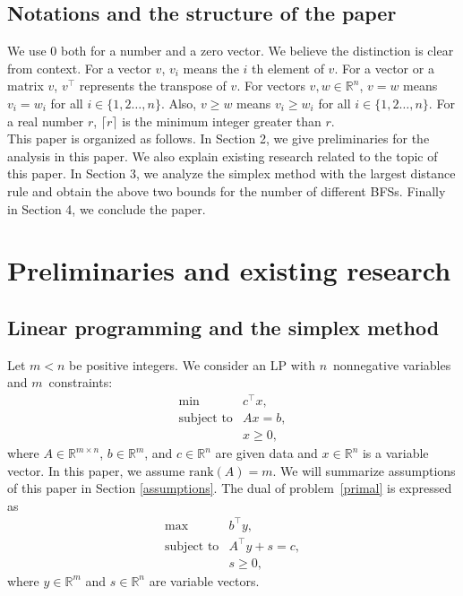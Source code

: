 \documentclass[12pt]{article}
\begin{document}
\subsection{Notations and the structure of the paper}
We use $0$ both for a number and a zero vector. 
We believe the distinction is clear from context.
For a vector $v$, $v_i$ means the $i$ th element of $v$. 
For a vector or a matrix $v$, $v^{\top}$ represents the transpose of $v$. 
For vectors $v,w\in \mathbb{R}^n$, $v=w$ means $v_i=w_i$ for all $i\in\{1,2\dots,n\}$. 
Also, $v\ge w$ means $v_i\ge w_i$ for all $i\in\{1,2\dots,n\}$. 
For a real number $r$, $\lceil r\rceil$ is the minimum integer greater than $r$.\\ 

This paper is organized as follows. 
In Section 2, we give preliminaries for the analysis in this paper. 
We also explain existing research related to the topic of this paper.  
In Section 3, we analyze the simplex method with the largest distance rule and obtain the above two bounds for the number of different BFSs. 
Finally in Section 4, we conclude the paper.
%
\section{
Preliminaries and existing research
}
\subsection{Linear programming and the simplex method} \label{sec:LP}
Let $m<n$ be positive integers. We consider an LP with $n$~nonnegative variables and $m$~constraints:
\begin{equation} \label{primal}
\begin{array}{ll}
\min&c^{\top}x,\\
\text{subject to}&Ax=b,\\
&x\ge0,
\end{array}
\end{equation}
where $A \in \mathbb{R}^{m \times n}$, $b \in \mathbb{R}^m$, and $c \in \mathbb{R}^n$ are given data and $x \in \mathbb{R}^n$ is a variable vector.
In this paper, we assume $\mathrm{rank}(A)=m$.  
We will summarize assumptions of this paper in Section \ref{assumptions}. 
%
The dual of problem~\eqref{primal} is expressed as
\begin{equation} \label{dual}
\begin{array}{ll}
\max&b^{\top}y,\\
\text{subject to}&A^{\top}y+s=c,\\
&s\ge0,
\end{array}
\end{equation}
where $y \in \mathbb{R}^m$ and $s \in \mathbb{R}^n$ are variable vectors.\\
\end{document}
